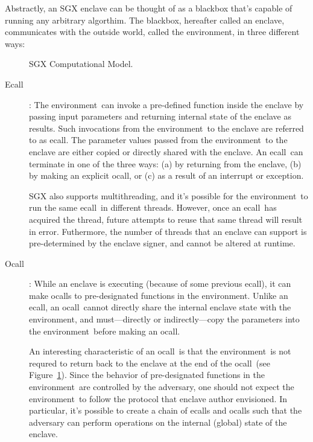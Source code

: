 \documentclass[11pt]{article}
\newcommand{\ecall}{\textsf{ecall}}
\newcommand{\ocall}{\textsf{ocall}}
\newcommand{\env}{\textsf{environment}}
\begin{document}
  Abstractly, an SGX enclave can be thought of as a blackbox that's
  capable of running any arbitrary algorthim. The blackbox, hereafter
  called an enclave, communicates with the outside world, called the
  \env, in three different ways:

  \begin{figure}[h]
  \centering
  
  \caption{SGX Computational Model.}
  \label{fig:model}
  \end{figure}

  \begin{description}
  \item[Ecall]: The \env\ can invoke a pre-defined function inside the
    enclave by passing input parameters and returning internal state
    of the enclave as results. Such invocations from the \env\ to the
    enclave are referred to as \ecall. The parameter values passed
    from the \env\ to the enclave are either copied or directly shared
    with the enclave. An \ecall\ can terminate in one of the three
    ways: (a) by returning from the enclave, (b) by making an explicit
    \ocall, or (c) as a result of an interrupt or exception.

    SGX also supports multithreading, and it's possible for the
    \env\ to run the same \ecall\ in different threads. However, once
    an \ecall\ has acquired the thread, future attempts to reuse that
    same thread will result in error. Futhermore, the number of
    threads that an enclave can support is pre-determined by the
    enclave signer, and cannot be altered at runtime.

  \item [Ocall]: While an enclave is executing (because of some
    previous \ecall), it can make \ocall s  to pre-designated
    functions in the \env.  Unlike an \ecall, an \ocall\ cannot
    directly share the internal enclave state with the \env, and
    must---directly or indirectly---copy the parameters into the
    \env\ before making an \ocall.

    An interesting characteristic of an \ocall\ is that the \env\ is
    not requred to return back to the enclave at the end of the
    \ocall\ (see Figure~\ref{fig:model}). Since the behavior of pre-designated
    functions in the \env\ are controlled by the adversary, one should
    not expect the \env\ to follow the protocol that enclave author
    envisioned. In particular, it's possible to create a chain of
    \ecall s and \ocall s such that the adversary can perform
    operations on the internal (global) state of the enclave.


\end{description}
\end{document}
